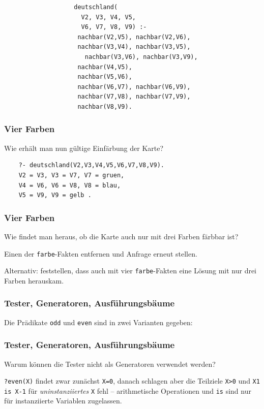 \documentclass{beamer}
\begin{document}
\begin{frame}[fragile]
\begin{figure}
\begin{subfigure}{0.3\textwidth}
    \end{subfigure}
    \pause
    \begin{subfigure}{0.65\textwidth}
      \begin{lstlisting}
        deutschland(
          V2, V3, V4, V5,
          V6, V7, V8, V9) :-
         nachbar(V2,V5), nachbar(V2,V6),
         nachbar(V3,V4), nachbar(V3,V5),
           nachbar(V3,V6), nachbar(V3,V9),
         nachbar(V4,V5),
         nachbar(V5,V6),
         nachbar(V6,V7), nachbar(V6,V9),
         nachbar(V7,V8), nachbar(V7,V9),
         nachbar(V8,V9).
      \end{lstlisting}
    \end{subfigure}
  \end{figure}
\end{frame}

\begin{frame}[fragile]
  \frametitle{Vier Farben}
  Wie erhält man nun gültige Einfärbung der Karte?
  \pause
  \begin{lstlisting}
    ?- deutschland(V2,V3,V4,V5,V6,V7,V8,V9).
    V2 = V3, V3 = V7, V7 = gruen,
    V4 = V6, V6 = V8, V8 = blau,
    V5 = V9, V9 = gelb .
  \end{lstlisting}
\end{frame}

\begin{frame}
  \frametitle{Vier Farben}
  Wie findet man heraus, ob die Karte auch nur mit drei Farben färbbar ist?
  
  \pause
  Einen der \lstinline{farbe}-Fakten entfernen und Anfrage erneut stellen.
  
  \pause
  Alternativ: feststellen, dass auch mit vier \lstinline{farbe}-Fakten eine Lösung mit nur drei Farben herauskam.
\end{frame}

\begin{frame}
  \frametitle{Tester, Generatoren, Ausführungsbäume}
  Die Prädikate \lstinline{odd} und \lstinline{even} sind in zwei Varianten gegeben:
  
  
\end{frame}

\begin{frame}
  \frametitle{Tester, Generatoren, Ausführungsbäume}
  
  Warum können die Tester nicht als Generatoren verwendet werden?
  
  \pause
  \lstinline{?even(X)} findet zwar zunächst \lstinline{X=0},
  danach schlagen aber die Teilziele \lstinline{X>0} und \lstinline{X1 is X-1} für \emph{uninstanziiertes} \lstinline{X} fehl –
  arithmetische Operationen und \lstinline{is} sind nur für instanziierte Variablen zugelassen.
\end{frame}
\end{document}
